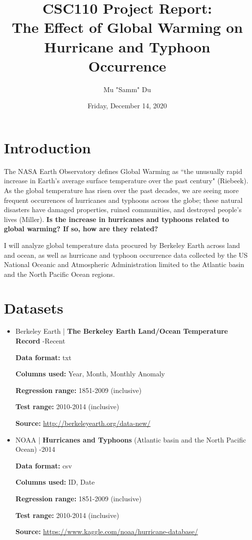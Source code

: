 \documentclass[fontsize=11pt]{article}
\title{CSC110 Project Report: \\The Effect of Global Warming on Hurricane and Typhoon Occurrence}
\author{Mu "Samm" Du}
\date{Friday, December 14, 2020}
\begin{document}
\maketitle

\section*{Introduction}

\qquad The NASA Earth Observatory defines Global Warming as ``the unusually rapid increase in Earth’s average surface temperature over the past century" (Riebeek). As the global temperature has risen over the past decades, we are seeing more frequent occurrences of hurricanes and typhoons across the globe; these natural disasters have damaged properties, ruined communities, and destroyed people's lives (Miller). \textbf{Is the increase in hurricanes and typhoons related to global warming? If so, how are they related?}

\enspace I will analyze global temperature data procured by Berkeley Earth across land and ocean, as well as hurricane and typhoon occurrence data collected by the US National Oceanic and Atmospheric Administration limited to the Atlantic basin and the North Pacific Ocean regions.

\section*{Datasets}
\begin{itemize}

    \item Berkeley Earth | \textbf{The Berkeley Earth Land/Ocean Temperature Record} -Recent

    \medskip

    \textbf{Data format:} txt

    \textbf{Columns used:} Year, Month, Monthly Anomaly

    \textbf{Regression range:} 1851-2009 (inclusive)

    \textbf{Test range:} 2010-2014 (inclusive)

    \textbf{Source:}
    \url{http://berkeleyearth.org/data-new/}

    \bigskip

    \item NOAA | \textbf{Hurricanes and Typhoons} (Atlantic
basin and the North Pacific Ocean) -2014

    \medskip

    \textbf{Data format:} csv

    \textbf{Columns used:} ID, Date

    \textbf{Regression range:} 1851-2009 (inclusive)

    \textbf{Test range:} 2010-2014 (inclusive)

    \textbf{Source:}
    \url{https://www.kaggle.com/noaa/hurricane-database/}

\end{itemize}
\end{document}
